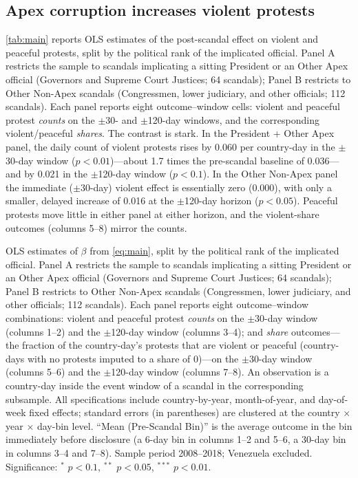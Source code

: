 \documentclass[11pt]{article}
\let\mathbetasym\beta
\renewcommand{\beta}{\ensuremath{\mathbetasym}}
\begin{document}
\subsection{Apex corruption increases violent protests}

\autoref{tab:main} reports OLS estimates of the post-scandal effect on violent and peaceful protests, split by the political rank of the implicated official. Panel A restricts the sample to scandals implicating a sitting President or an Other Apex official (Governors and Supreme Court Justices; 64 scandals); Panel B restricts to Other Non-Apex scandals (Congressmen, lower judiciary, and other officials; 112 scandals). Each panel reports eight outcome--window cells: violent and peaceful protest \emph{counts} on the $\pm$30- and $\pm$120-day windows, and the corresponding violent/peaceful \emph{shares}. The contrast is stark. In the President + Other Apex panel, the daily count of violent protests rises by 0.060 per country-day in the $\pm$30-day window ($p<0.01$)---about 1.7 times the pre-scandal baseline of 0.036---and by 0.021 in the $\pm$120-day window ($p<0.1$). In the Other Non-Apex panel the immediate ($\pm$30-day) violent effect is essentially zero (0.000), with only a smaller, delayed increase of 0.016 at the $\pm$120-day horizon ($p<0.05$). Peaceful protests move little in either panel at either horizon, and the violent-share outcomes (columns 5--8) mirror the counts.

\begin{table}[htb!]
    \caption{Violent protests increase after apex corruption scandal disclosures.}
    \label{tab:main}
    \begin{center}
        \scriptsize{}
    \end{center}
    \footnotesize{OLS estimates of $\beta$ from \autoref{eq:main}, split by the political rank of the implicated official. Panel A restricts the sample to scandals implicating a sitting President or an Other Apex official (Governors and Supreme Court Justices; 64 scandals); Panel B restricts to Other Non-Apex scandals (Congressmen, lower judiciary, and other officials; 112 scandals). Each panel reports eight outcome--window combinations: violent and peaceful protest \emph{counts} on the $\pm$30-day window (columns 1--2) and the $\pm$120-day window (columns 3--4); and \emph{share} outcomes---the fraction of the country-day's protests that are violent or peaceful (country-days with no protests imputed to a share of 0)---on the $\pm$30-day window (columns 5--6) and the $\pm$120-day window (columns 7--8). An observation is a country-day inside the event window of a scandal in the corresponding subsample. All specifications include country-by-year, month-of-year, and day-of-week fixed effects; standard errors (in parentheses) are clustered at the country $\times$ year $\times$ day-bin level. ``Mean (Pre-Scandal Bin)'' is the average outcome in the bin immediately before disclosure (a 6-day bin in columns 1--2 and 5--6, a 30-day bin in columns 3--4 and 7--8). Sample period 2008--2018; Venezuela excluded. Significance: $^{*}$ $p<0.1$, $^{**}$ $p<0.05$, $^{***}$ $p<0.01$.}
\end{table}
\end{document}
